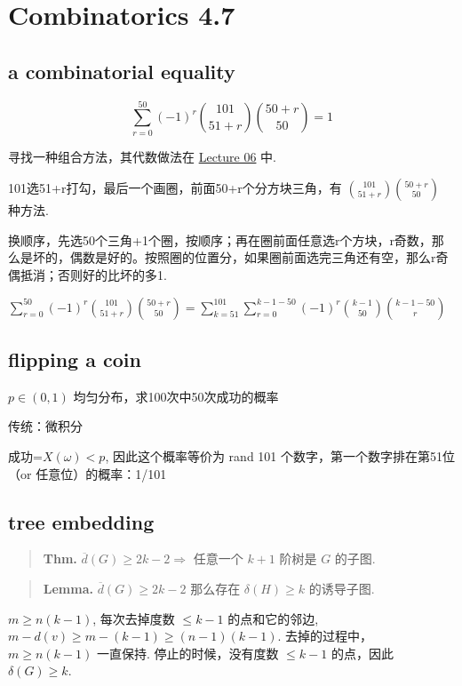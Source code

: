 \chapter{Combinatorics 4.7}
\label{ch:250407}

\section{a combinatorial equality}

\[
\sum_{r=0}^{50}(-1)^r{101\choose 51+r}{50+r\choose 50}=1
\]

寻找一种组合方法，其代数做法在 \href{250324.md}{Lecture 06} 中.

101选51+r打勾，最后一个画圈，前面50+r个分方块三角，有 ${101\choose 51+r}{50+r\choose 50}$ 种方法.

换顺序，先选50个三角+1个圈，按顺序；再在圈前面任意选r个方块，r奇数，那么是坏的，偶数是好的。按照圈的位置分，如果圈前面选完三角还有空，那么r奇偶抵消；否则好的比坏的多1.

$\sum_{r=0}^{50}(-1)^r{101\choose 51+r}{50+r\choose 50}=\sum_{k=51}^{101}\sum_{r=0}^{k-1-50}(-1)^r{k-1\choose 50}{k-1-50\choose r}$

\section{flipping a coin}

$p\in(0,1)$ 均匀分布，求100次中50次成功的概率

传统：微积分

成功=$X(\omega)<p$, 因此这个概率等价为 rand 101 个数字，第一个数字排在第51位（or 任意位）的概率：1/101

\section{tree embedding}


\begin{quotation}
\textbf{Thm.} $\overline{d}(G)\geq 2k-2\Rightarrow$ 任意一个 $k+1$ 阶树是 $G$ 的子图.
\end{quotation}

\begin{quotation}
\textbf{Lemma.} $\overline{d}(G)\geq 2k-2$ 那么存在 $\delta(H)\geq k$ 的诱导子图.
\end{quotation}

$m\geq n(k-1)$, 每次去掉度数 $\leq k-1$ 的点和它的邻边, $m-d(v)\geq m-(k-1)\geq(n-1)(k-1)$. 去掉的过程中，$m\geq n(k-1)$ 一直保持. 停止的时候，没有度数 $\leq k-1$ 的点，因此 $\delta(G)\geq k$.

